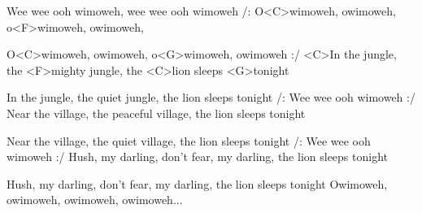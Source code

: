 
\zs
Wee wee ooh wimoweh,
wee wee ooh wimoweh
\ks
\zr
/: O<C>wimoweh, owimoweh, o<F>wimoweh, owimoweh,

O<C>wimoweh, owimoweh, o<G>wimoweh, owimoweh :/
\kr
\zs
<C>In the jungle, the <F>mighty jungle, the <C>lion sleeps <G>tonight

In the jungle, the quiet jungle, the lion sleeps tonight
\ks
\zr
/: Wee wee ooh wimoweh :/
\kr
\zs
Near the village, the peaceful village, the lion sleeps tonight

Near the village, the quiet village, the lion sleeps tonight
\ks
\zr
/: Wee wee ooh wimoweh :/
\kr
\zs
Hush, my darling, don’t fear, my darling, the lion sleeps tonight

Hush, my darling, don’t fear, my darling, the lion sleeps tonight
\ks
\zr
Owimoweh, owimoweh, owimoweh, owimoweh...
\kr
\kp
